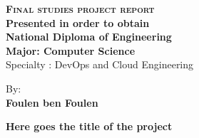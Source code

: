\begin{center}
    
\end{center}
\begin{center}
{\large{\textbf{\textsc{Final studies project report}}}}\\
{\textbf{Presented in order to obtain }}\\
{\textbf{National Diploma of Engineering}}\\
{\textbf{Major: Computer Science}}\\
{Specialty : DevOps and Cloud Engineering}
\end{center}

\begin{center}
\textrm{By:}\\
{\large\textbf{Foulen ben Foulen}}\\
\vskip1cm
    \begin{minipage}[l]{1\columnwidth}
  
        \begin{tcolorbox}[colframe=isiBlue,colback=white,boxrule=2pt,arc=10pt,height=43mm]
         \vskip3mm
            \centering
        {\huge\textbf{Here goes the title of the project}} 
        \end{tcolorbox}
    \end{minipage}
\end{center}

